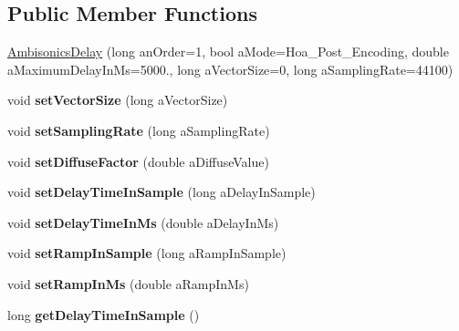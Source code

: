 \subsection*{Public Member Functions}
\begin{DoxyCompactItemize}
\item 
\hyperlink{class_ambisonics_delay_ae51a035b03153c0747a6eefba102bdcf}{Ambisonics\-Delay} (long an\-Order=1, bool a\-Mode=Hoa\-\_\-\-Post\-\_\-\-Encoding, double a\-Maximum\-Delay\-In\-Ms=5000., long a\-Vector\-Size=0, long a\-Sampling\-Rate=44100)
\item 
\hypertarget{class_ambisonics_delay_a652ad6ff16b644f267cef3daa662c24f}{void {\bfseries set\-Vector\-Size} (long a\-Vector\-Size)}\label{class_ambisonics_delay_a652ad6ff16b644f267cef3daa662c24f}

\item 
\hypertarget{class_ambisonics_delay_a3e8bb9fe1ebe947f9022946bf9677423}{void {\bfseries set\-Sampling\-Rate} (long a\-Sampling\-Rate)}\label{class_ambisonics_delay_a3e8bb9fe1ebe947f9022946bf9677423}

\item 
\hypertarget{class_ambisonics_delay_a63710b55a6df91212dfbb709dadfc5b6}{void {\bfseries set\-Diffuse\-Factor} (double a\-Diffuse\-Value)}\label{class_ambisonics_delay_a63710b55a6df91212dfbb709dadfc5b6}

\item 
\hypertarget{class_ambisonics_delay_a023a1c68660216fa2359fccab8be8ffb}{void {\bfseries set\-Delay\-Time\-In\-Sample} (long a\-Delay\-In\-Sample)}\label{class_ambisonics_delay_a023a1c68660216fa2359fccab8be8ffb}

\item 
\hypertarget{class_ambisonics_delay_ad8abb0bc0d9b34c857375a5eb6fd5601}{void {\bfseries set\-Delay\-Time\-In\-Ms} (double a\-Delay\-In\-Ms)}\label{class_ambisonics_delay_ad8abb0bc0d9b34c857375a5eb6fd5601}

\item 
\hypertarget{class_ambisonics_delay_ad414fad7d0a4be43e29865b3a2fc9aad}{void {\bfseries set\-Ramp\-In\-Sample} (long a\-Ramp\-In\-Sample)}\label{class_ambisonics_delay_ad414fad7d0a4be43e29865b3a2fc9aad}

\item 
\hypertarget{class_ambisonics_delay_a6dd3696561b8d3b72ab0a016a7b85b81}{void {\bfseries set\-Ramp\-In\-Ms} (double a\-Ramp\-In\-Ms)}\label{class_ambisonics_delay_a6dd3696561b8d3b72ab0a016a7b85b81}

\item 
\hypertarget{class_ambisonics_delay_a5cb44c9bb1e3b93cac70e78d3b2d0c89}{long {\bfseries get\-Delay\-Time\-In\-Sample} ()}\label{class_ambisonics_delay_a5cb44c9bb1e3b93cac70e78d3b2d0c89}


\end{DoxyCompactItemize}

